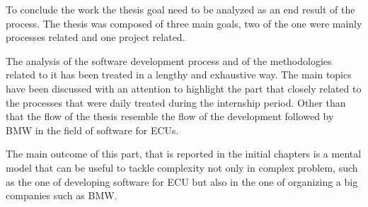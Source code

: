 \documentclass[../main.tex]{subfiles}
\begin{document}
To conclude the work the thesis goal need to be analyzed as an end result of the process. The thesis was composed of three main goals, two of the one were mainly processes related and one project related. 

The analysis of the software development process and of the methodologies related to it has been treated in a lengthy and exhaustive way. The main topics have been discussed with an attention to highlight the part that closely related to the processes that were daily treated during the internship period. Other than that the flow of the thesis resemble the flow of the development followed by \gls{BMW} in the field of software for \gls{ECU}s. 

The main outcome of this part, that is reported in the initial chapters is a mental model that can be useful to tackle complexity not only in complex problem, such as the one of developing software for \gls{ECU} but also in the one of organizing a big companies such as \gls{BMW}.
\end{document}
